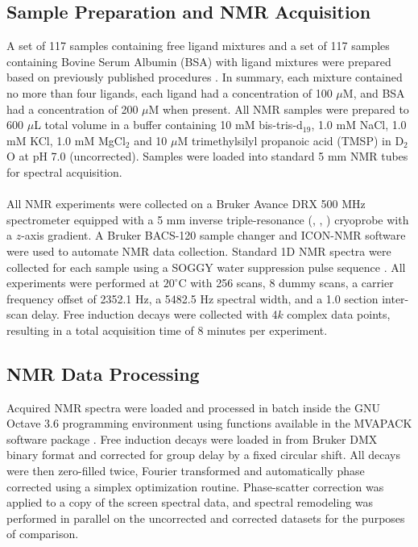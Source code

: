 \subsection{Sample Preparation and NMR Acquisition}

\begin{doublespace}
A set of 117 samples containing free ligand mixtures and a set of 117 samples
containing Bovine Serum Albumin (BSA) with ligand mixtures were prepared based
on previously published procedures \cite{powers:ddt2008,mercier:cchts2009}.
In summary, each mixture contained no more than four ligands, each ligand had
a concentration of 100 $\mu$M, and BSA had a concentration of 200 $\mu$M when
present. All NMR samples were prepared to 600 $\mu$L total volume in a buffer
containing 10 mM bis-tris-d$_{19}$, 1.0 mM NaCl, 1.0 mM KCl, 1.0 mM MgCl$_2$
and 10 $\mu$M trimethylsilyl propanoic acid (TMSP) in D$_2$O at pH 7.0
(uncorrected). Samples were loaded into standard 5 mm NMR tubes for spectral
acquisition.
\\\\
All NMR experiments were collected on a Bruker Avance DRX 500 MHz spectrometer
equipped with a 5 mm inverse triple-resonance (\hnmr{}, \cnmr{}, \nnmr{})
cryoprobe with a $z$-axis gradient. A Bruker BACS-120 sample changer and
ICON-NMR software were used to automate NMR data collection. Standard 1D
\hnmr{} NMR spectra were collected for each sample using a SOGGY water
suppression pulse sequence \cite{hwang:jmr1995,nguyen:jmr2007}. All
experiments were performed at $20^\circ$C with 256 scans, 8 dummy scans,
a carrier frequency offset of 2352.1 Hz, a 5482.5 Hz spectral width, and a 1.0
section inter-scan delay. Free induction decays were collected with 4$k$
complex data points, resulting in a total acquisition time of 8 minutes per
experiment.
\end{doublespace}

\subsection{NMR Data Processing}

\begin{doublespace}
Acquired NMR spectra were loaded and processed in batch inside the GNU Octave
3.6 programming environment \cite{eaton2008} using functions available in the
MVAPACK software package \cite{worley:acscb2014}. Free induction decays were
loaded in from Bruker DMX binary format and corrected for group delay by a
fixed circular shift. All decays were then zero-filled twice, Fourier
transformed and automatically phase corrected using a simplex optimization
routine. Phase-scatter correction was applied to a copy of the screen spectral
data, and spectral remodeling was performed in parallel on the uncorrected and
corrected datasets for the purposes of comparison.
\end{doublespace}

